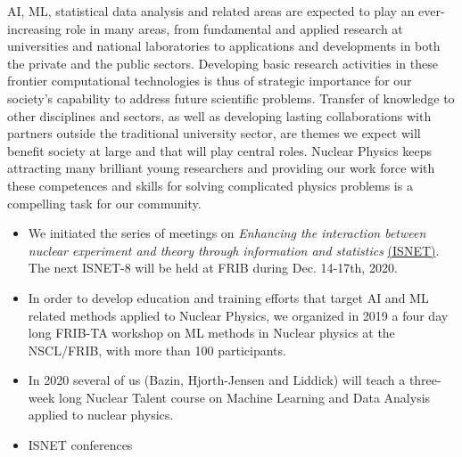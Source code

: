 \documentclass[%
10pt]{article}
\begin{document}
AI, ML, statistical data analysis and related areas are expected to
play an ever-increasing role in many areas, from fundamental and
applied research at universities and national laboratories to
applications and developments in both the private and the public
sectors.
Developing basic research activities in these frontier
computational technologies is thus of strategic importance for our
society’s capability to address future scientific problems. Transfer
of knowledge to other disciplines and sectors, as well as developing
lasting collaborations with partners outside the traditional
university sector, are themes we expect will benefit society at large
and that will play central roles. Nuclear Physics keeps attracting many brilliant young researchers and providing our work force with these competences and skills for solving complicated physics problems is a compelling task for our community.


\begin{itemize}
\item
We initiated the series of meetings on {\it Enhancing the interaction between nuclear experiment and theory through information and statistics} \href{https://iopscience.iop.org/journal/0954-3899/page/ISNET}{(ISNET)}.  The next ISNET-8 will be held at FRIB during  Dec. 14-17th, 2020.

\item In order to develop education and training efforts that target AI and ML related methods applied to Nuclear Physics, we  organized in 2019 a four day long  FRIB-TA workshop on ML methods in Nuclear physics at the NSCL/FRIB, with more than 100 participants.

\item In 2020 several of us (Bazin, Hjorth-Jensen and Liddick) will teach a three-week long Nuclear Talent course on Machine Learning and Data Analysis applied to nuclear physics. 

\item ISNET conferences
\end{itemize}
\end{document}
